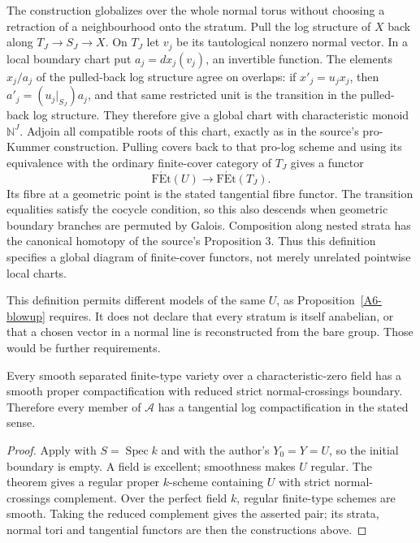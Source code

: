 The construction globalizes over the whole normal torus without choosing a retraction of a neighbourhood onto the stratum. Pull the log structure of $X$ back along $T_J\to S_J\to X$. On $T_J$ let $v_j$ be its tautological nonzero normal vector. In a local boundary chart put $a_j=dx_j(v_j)$, an invertible function. The elements $x_j/a_j$ of the pulled-back log structure agree on overlaps: if $x'_j=u_jx_j$, then $a'_j=(u_j|_{S_J})a_j$, and that same restricted unit is the transition in the pulled-back log structure. They therefore give a global chart with characteristic monoid $\mathbb N^J$. Adjoin all compatible roots of this chart, exactly as in the source's pro-Kummer construction. Pulling covers back to that pro-log scheme and using its equivalence with the ordinary finite-cover category of $T_J$ gives a functor
\[
 \operatorname{F\acute Et}(U)\longrightarrow
 \operatorname{F\acute Et}(T_J).
\]
Its fibre at a geometric point is the stated tangential fibre functor. The transition equalities satisfy the cocycle condition, so this also descends when geometric boundary branches are permuted by Galois. Composition along nested strata has the canonical homotopy of the source's Proposition 3. Thus this definition specifies a global diagram of finite-cover functors, not merely unrelated pointwise local charts.

This definition permits different models of the same $U$, as Proposition~\ref{A6-blowup} requires. It does not declare that every stratum is itself anabelian, or that a chosen vector in a normal line is reconstructed from the bare group. Those would be further requirements.

\begin{proposition}\label{A6-SNC-existence}
Every smooth separated finite-type variety over a characteristic-zero field has a smooth proper compactification with reduced strict normal-crossings boundary. Therefore every member of $\mathcal A$ has a tangential log compactification in the stated sense.
\end{proposition}
\begin{proof}
Apply \cite[Theorem 1.1.15]{Temkin2018A567} with $S=\operatorname{Spec}k$ and with the author's $Y_0=Y=U$, so the initial boundary is empty. A field is excellent; smoothness makes $U$ regular. The theorem gives a regular proper $k$-scheme containing $U$ with strict normal-crossings complement. Over the perfect field $k$, regular finite-type schemes are smooth. Taking the reduced complement gives the asserted pair; its strata, normal tori and tangential functors are then the constructions above.
\end{proof}

